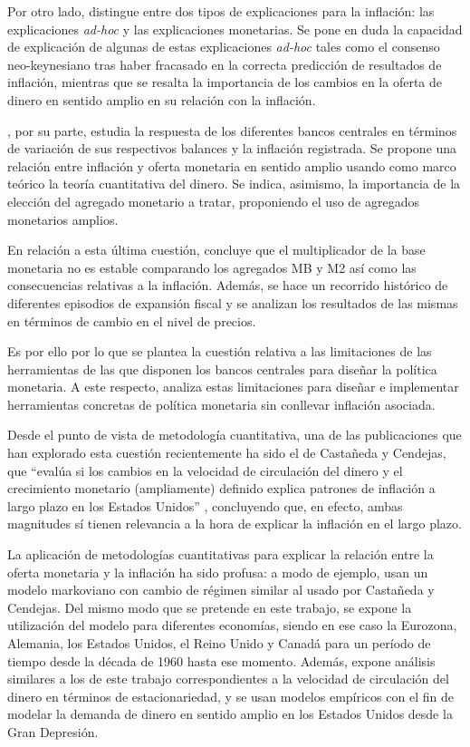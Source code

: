 \documentclass[titlepage, 12pt]{article}
\begin{document}
Por otro lado, \cite{greenwood2021} distingue entre dos tipos de explicaciones para la inflación: las explicaciones \textit{ad-hoc} y las explicaciones monetarias. Se pone en duda la capacidad de explicación de algunas de estas explicaciones \textit{ad-hoc} tales como el consenso neo-keynesiano tras haber fracasado en la correcta predicción de resultados de inflación, mientras que se resalta la importancia de los cambios en la oferta de dinero en sentido amplio en su relación con la inflación.

\cite{reynard2023}, por su parte, estudia la respuesta de los diferentes bancos centrales en términos de variación de sus respectivos balances y la inflación registrada. Se propone una relación entre inflación y oferta monetaria en sentido amplio usando como marco teórico la teoría cuantitativa del dinero. Se indica, asimismo, la importancia de la elección del agregado monetario a tratar, proponiendo el uso de agregados monetarios amplios.

En relación a esta última cuestión, \cite{bordo2021} concluye que el multiplicador de la base monetaria no es estable comparando los agregados MB y M2 así como las consecuencias relativas a la inflación. Además, se hace un recorrido histórico de diferentes episodios de expansión fiscal y se analizan los resultados de las mismas en términos de cambio en el nivel de precios.

Es por ello por lo que se plantea la cuestión relativa a las limitaciones de las herramientas de las que disponen los bancos centrales para diseñar la política monetaria. A este respecto, \cite{congdon2021} analiza estas limitaciones para diseñar e implementar herramientas concretas de política monetaria sin conllevar inflación asociada.

Desde el punto de vista de metodología cuantitativa, una de las publicaciones que han explorado esta cuestión recientemente ha sido el de Castañeda y Cendejas, que \enquote{evalúa si los cambios en la velocidad de circulación del dinero y el crecimiento monetario (ampliamente) definido explica patrones de inflación a largo plazo en los Estados Unidos} \autocite[2]{castaneda2023}, concluyendo que, en efecto, ambas magnitudes sí tienen relevancia a la hora de explicar la inflación en el largo plazo.

La aplicación de metodologías cuantitativas para explicar la relación entre la oferta monetaria y la inflación ha sido profusa: a modo de ejemplo, \cite{amisano2013} usan un modelo markoviano con cambio de régimen similar al usado por Castañeda y Cendejas. Del mismo modo que se pretende en este trabajo, se expone la utilización del modelo para diferentes economías, siendo en ese caso la Eurozona, Alemania, los Estados Unidos, el Reino Unido y Canadá para un período de tiempo desde la década de 1960 hasta ese momento. Además, \cite{anderson2017} expone análisis similares a los de este trabajo correspondientes a la velocidad de circulación del dinero en términos de estacionariedad, y se usan modelos empíricos con el fin de modelar la demanda de dinero en sentido amplio en los Estados Unidos desde la Gran Depresión.
\end{document}
